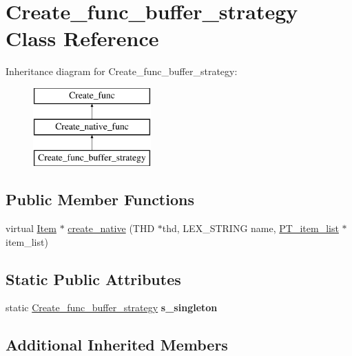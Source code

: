 \hypertarget{classCreate__func__buffer__strategy}{}\section{Create\+\_\+func\+\_\+buffer\+\_\+strategy Class Reference}
\label{classCreate__func__buffer__strategy}
Inheritance diagram for Create\+\_\+func\+\_\+buffer\+\_\+strategy\+:\begin{figure}[H]
\begin{center}
\leavevmode
\includegraphics[height=3.000000cm]{classCreate__func__buffer__strategy}
\end{center}
\end{figure}
\subsection*{Public Member Functions}
\begin{DoxyCompactItemize}
\item 
virtual \mbox{\hyperlink{classItem}{Item}} $\ast$ \mbox{\hyperlink{classCreate__func__buffer__strategy_a63dbe67c96b063b8cb7932becd95cd26}{create\+\_\+native}} (T\+HD $\ast$thd, L\+E\+X\+\_\+\+S\+T\+R\+I\+NG name, \mbox{\hyperlink{classPT__item__list}{P\+T\+\_\+item\+\_\+list}} $\ast$item\+\_\+list)
\end{DoxyCompactItemize}
\subsection*{Static Public Attributes}
\begin{DoxyCompactItemize}
\item 
\mbox{\label{classCreate__func__buffer__strategy_a637600f0cdeecd6633da408783ee56d7}} 
static \mbox{\hyperlink{classCreate__func__buffer__strategy}{Create\+\_\+func\+\_\+buffer\+\_\+strategy}} {\bfseries s\+\_\+singleton}
\end{DoxyCompactItemize}
\subsection*{Additional Inherited Members}



